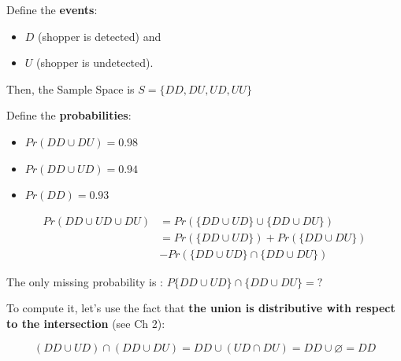 \documentclass[notes=show,handout]{beamer}\usepackage[]{graphicx}\usepackage[]{color}
\begin{document}
\begin{frame}{\secname}
  \begin{example}
    \begin{footnotesize}
      Define the \textbf{events}:

      \begin{itemize}
      \item $D$ (shopper is detected) and
      \item $U$ (shopper is undetected).
      \end{itemize}

      Then, the Sample Space is $S=\{ DD, DU, UD, UU\}$

      Define the \textbf{probabilities}:
      \begin{itemize}
      \item $Pr(DD \cup DU) = 0.98$
      \item $Pr(DD \cup UD) = 0.94$
      \item $Pr(DD) = 0.93$
      \end{itemize}
    \end{footnotesize}
  \end{example}
\end{frame}

\begin{frame}{\secname}
  \begin{example}

  \begin{footnotesize}
  \begin{align*}
  Pr(DD \cup UD \cup DU) &= Pr(\{DD \cup UD\} \cup \{DD \cup DU\})\\
  &= Pr(\{DD \cup UD\}) + Pr(\{DD \cup DU\})\\
  &- Pr(\{DD \cup UD\} \cap \{DD \cup DU\})
  \end{align*}

  The only missing probability is : $P\{DD \cup UD\} \cap \{DD \cup DU\} = ?$

  To compute it, let's use the fact that \textbf{the union is distributive with respect to the intersection} (see Ch 2):

  $$(DD \cup UD) \cap (DD \cup DU) = DD \cup (UD \cap DU) =DD \cup \varnothing = DD$$
  \end{footnotesize}
  \end{example}
\end{frame}
\end{document}
